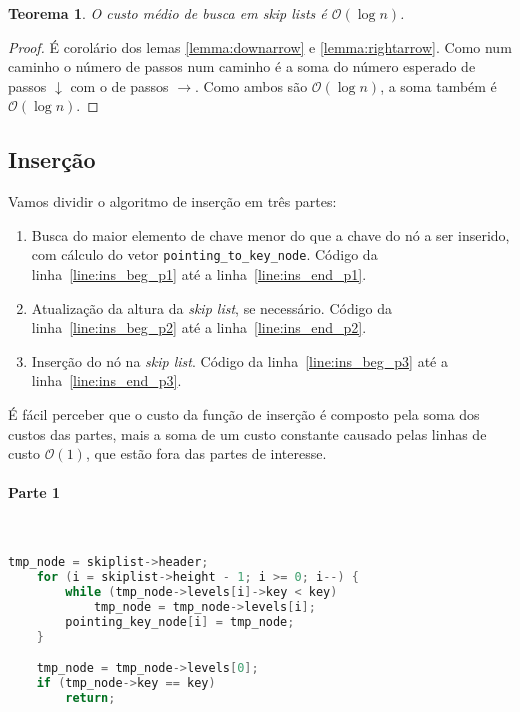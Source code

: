 \documentclass[paper=a4, fontsize=11pt]{scrartcl} %
\newtheorem{theorem}{Teorema}
\numberwithin{equation}{section}
\numberwithin{figure}{section}
\numberwithin{table}{section}
\numberwithin{definition}{section}
\numberwithin{theorem}{section}
\numberwithin{property}{section}
\numberwithin{proposition}{section}
\newcommand{\cO}{\ensuremath{\mathcal{O}}}
\newcommand{\sls}{\textit{skip lists}\xspace}
\renewcommand{\sl}{\textit{skip list}\xspace}
\begin{document}
\begin{theorem}
O custo médio de busca em \sls é $\cO(\log n)$. 
\end{theorem}

\begin{proof}
É corolário dos lemas \ref{lemma:downarrow} e \ref{lemma:rightarrow}. Como num caminho o número de passos
num caminho é a soma do número esperado de passos $\downarrow$ com o de passos $\rightarrow$. Como ambos são
$\cO(\log n)$, a soma também é $\cO(\log n)$.
\end{proof}

\subsection{Inserção}

Vamos dividir o algoritmo de inserção em três partes:
\begin{enumerate}[noitemsep]
  \item Busca do maior elemento de chave menor do que a chave do nó a ser inserido, com cálculo do vetor 
    \verb|pointing_to_key_node|. Código da linha~\ref{line:ins_beg_p1} até a linha~\ref{line:ins_end_p1}.
  \item Atualização da altura da \sl, se necessário. 
      Código da linha~\ref{line:ins_beg_p2} até a linha~\ref{line:ins_end_p2}.
  \item Inserção do nó na \sl. Código da linha~\ref{line:ins_beg_p3} até a linha~\ref{line:ins_end_p3}. 
\end{enumerate}

É fácil perceber que o custo da função de inserção é composto pela soma dos custos das partes, mais a soma
de um custo constante causado pelas linhas de custo $\cO(1)$, que estão fora das partes de interesse.

\paragraph{Parte 1}
\ \\
\begin{lstlisting}[caption=Inserção Parte 1., language=C]
    tmp_node = skiplist->header;                        
    for (i = skiplist->height - 1; i >= 0; i--) {
        while (tmp_node->levels[i]->key < key)
            tmp_node = tmp_node->levels[i];
        pointing_key_node[i] = tmp_node;
    }                                                    

    tmp_node = tmp_node->levels[0];
    if (tmp_node->key == key)
        return;                                          
\end{lstlisting}
\end{document}
